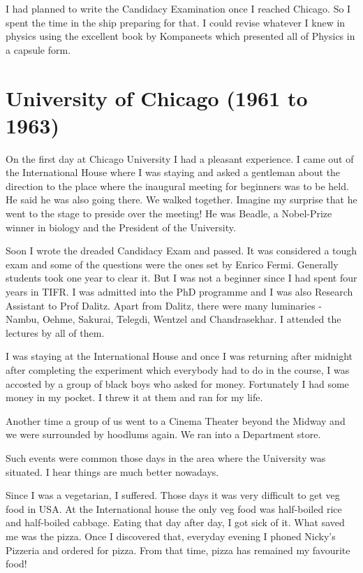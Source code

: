 I had planned to write the Candidacy Examination once I reached Chicago. 
So I spent the time in the ship preparing for that. I could revise 
whatever I knew in physics using the excellent book by Kompaneets which 
presented all of Physics in a capsule form.

\section*{University of Chicago (1961 to 1963)}

On the first day at Chicago University I had a pleasant experience. I 
came out of the International House where I was staying and asked a 
gentleman about the direction to the place where the inaugural meeting 
for beginners was to be held. He said he was also going there. We walked 
together. Imagine my surprise that he went to the stage to preside over 
the meeting! He was Beadle, a Nobel-Prize winner in biology and the 
President of the University.
    
Soon I wrote the dreaded Candidacy Exam and passed. It was considered a 
tough exam and some of the questions were the ones set by Enrico Fermi. 
Generally students took one year to clear it. But I was not a beginner 
since I had spent four years in TIFR. I was admitted into the PhD 
programme and I was also Research Assistant to Prof Dalitz. Apart from 
Dalitz, there were many luminaries - Nambu, Oehme, Sakurai, Telegdi, 
Wentzel and Chandrasekhar. I attended the lectures by all of them.

I was staying at the International House and once I was returning after 
midnight after completing the experiment which everybody had to do in 
the course, I was accosted by a group of black boys who asked for money. 
Fortunately I had some money in my pocket. I threw it at them and ran 
for my life.

Another time a group of us went to a Cinema Theater beyond the Midway 
and we were surrounded by hoodlums again. We ran into a Department 
store.

Such events were common those days in the area where the University was 
situated. I hear things are much better nowadays.

Since I was a vegetarian, I suffered. Those days it was very difficult 
to get veg food in USA. At the International house the only veg food was 
half-boiled rice and half-boiled cabbage. Eating that day after day, I 
got sick of it. What saved me was the pizza. Once I discovered that, 
everyday evening I phoned Nicky's Pizzeria and ordered for pizza. From 
that time, pizza has remained my favourite food!
 
